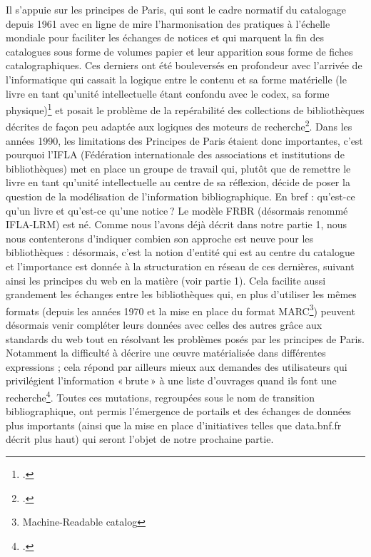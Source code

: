 Il s’appuie sur les principes de Paris, qui sont le cadre normatif du catalogage depuis 1961 avec en ligne de mire l’harmonisation des pratiques à l’échelle mondiale pour faciliter les échanges de notices et qui marquent la fin des catalogues sous forme de volumes papier et leur apparition sous forme de fiches catalographiques. Ces derniers ont été bouleversés en profondeur avec l’arrivée de l’informatique qui cassait la logique entre le contenu et sa forme matérielle (le livre en tant qu’unité intellectuelle étant confondu avec le codex, sa forme physique)\footcite[§ 2]{leresche_transition_2016} et posait le problème de la repérabilité des collections de bibliothèques décrites de façon peu adaptée aux logiques des moteurs de recherche\footcite[§ 2]{leresche_transition_2016}. Dans les années 1990, les limitations des Principes de Paris étaient donc importantes, c’est pourquoi l’IFLA (Fédération internationale des associations et institutions de bibliothèques) met en place un groupe de travail qui, plutôt que de remettre le livre en tant qu’unité intellectuelle au centre de sa réflexion, décide de poser la question de la modélisation de l’information bibliographique. En bref : qu’est-ce qu’un livre et qu’est-ce qu’une notice ? Le modèle FRBR (désormais renommé IFLA-LRM) est né. Comme nous l’avons déjà décrit dans notre partie 1, nous nous contenterons d’indiquer combien son approche est neuve pour les bibliothèques : désormais, c’est la notion d’entité qui est au centre du catalogue et l’importance est donnée à la structuration en réseau de ces dernières, suivant ainsi les principes du web en la matière (voir partie 1). Cela facilite aussi grandement les échanges entre les bibliothèques qui, en plus d’utiliser les mêmes formats (depuis les années 1970 et la mise en place du format MARC\footnote{Machine-Readable catalog}) peuvent désormais venir compléter leurs données avec celles des autres grâce aux standards du web tout en résolvant les problèmes posés par les principes de Paris. Notamment la difficulté à décrire une œuvre matérialisée dans différentes expressions ; cela répond par ailleurs mieux aux demandes des utilisateurs qui privilégient l’information « brute » à une liste d’ouvrages quand ils font une recherche\footcite[§ 13]{leresche_transition_2016}. Toutes ces mutations, regroupées sous le nom de transition bibliographique, ont permis l’émergence de portails et des échanges de données plus importants (ainsi que la mise en place d’initiatives telles que data.bnf.fr décrit plus haut) qui seront l’objet de notre prochaine partie.

